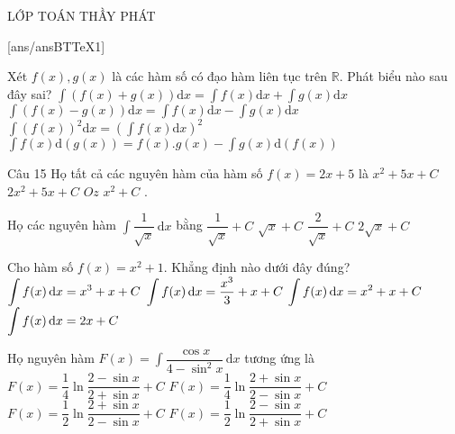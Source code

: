 \begin{name}
{\tenchude}{\tendethi}{LỚP TOÁN THẦY PHÁT}{\thoigian}
\end{name}

[ans/ansBTTeX1]
\begin{ex}%
Xét $f(x), g(x)$ là các hàm số có đạo hàm liên tục trên $\mathbb{R}$. Phát biểu nào sau đây sai?
\choice
{$\displaystyle\int\limits(f(x)+g(x))\mathrm{d}x=\displaystyle\int\limits f(x)\mathrm{d}x+\displaystyle\int\limits g(x)\mathrm{d}x$}
{$\displaystyle\int\limits(f(x)-g(x))\mathrm{d}x=\displaystyle\int\limits f(x)\mathrm{d}x-\displaystyle\int\limits g(x)\mathrm{d}x$}
{\True $\displaystyle\int\limits(f(x))^2\mathrm{d}x=\left(\displaystyle\int\limits f(x)\mathrm{d}x\right)^2$}
{$\displaystyle\int\limits f(x)\mathrm{d}(g(x))=f(x).g(x)-\displaystyle\int\limits g(x)\mathrm{d}(f(x))$}
\loigiai{}
\end{ex}

\begin{ex}Câu 15%
Họ tất cả các nguyên hàm của hàm số $f(x)=2x+5$ là
\choice
{\True $x^2+5x+C$}
{$2x^2+5x+C$}
{$Oz$}
{$x^2+C$}
.
\end{ex}

\begin{ex}%
Họ các nguyên hàm $\displaystyle\int \dfrac{1}{\sqrt{x}} \mathrm{\,d}x$ bằng
\choice
{$\dfrac{1}{\sqrt{x}}+C$}
{$\sqrt{x}+C$}
{$\dfrac{2}{\sqrt{x}}+C$}
{\True $2\sqrt{x}+C$}
\end{ex}

\begin{ex}%
Cho hàm số $f(x)=x^2+1$. Khẳng định nào dưới đây đúng?
\choice
{$\displaystyle\int{f(x){\rm{\,d}}x}=x^3+x+C$}
{\True $\displaystyle\int{f(x){\rm{\,d}}x}=\dfrac{x^3}{3}+x+C$}
{$\displaystyle\int{f(x){\rm{\,d}}x}=x^2+x+C$}
{$\displaystyle\int{f(x){\rm{\,d}}x}=2x+C$}
\end{ex}

\begin{ex}%
Họ nguyên hàm $F(x)=\displaystyle \int\dfrac{\cos x}{4-\sin^2x}\mathrm{\,d}x$ tương ứng là
\choice
{$F(x)=\dfrac{1}{4}\ln \dfrac{2-\sin x}{2+\sin x}+C$}
{\True $F(x)=\dfrac{1}{4}\ln \dfrac{2+\sin x}{2-\sin x}+C$}
{$F(x)=\dfrac{1}{2}\ln \dfrac{2+\sin x}{2-\sin x}+C$}	{$F(x)=\dfrac{1}{2}\ln \dfrac{2-\sin x}{2+\sin x}+C$}
\end{ex}

